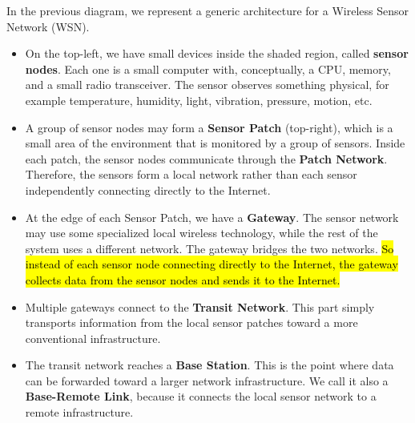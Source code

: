 \begin{examplebox}
\begin{center}
    \end{center}

    In the previous diagram, we represent a generic architecture for a Wireless Sensor Network (WSN).
    \begin{itemize}
        \item On the top-left, we have small devices inside the shaded region, called \textbf{sensor nodes}. Each one is a small computer with, conceptually, a CPU, memory, and a small radio transceiver. The sensor observes something physical, for example temperature, humidity, light, vibration, pressure, motion, etc.

        \item A group of sensor nodes may form a \textbf{Sensor Patch} (top-right), which is a small area of the environment that is monitored by a group of sensors. Inside each patch, the sensor nodes communicate through the \textbf{Patch Network}. Therefore, the sensors form a local network rather than each sensor independently connecting directly to the Internet.

        \item At the edge of each Sensor Patch, we have a \textbf{Gateway}. The sensor network may use some specialized local wireless technology, while the rest of the system uses a different network. The gateway bridges the two networks. \hl{So instead of each sensor node connecting directly to the Internet, the gateway collects data from the sensor nodes and sends it to the Internet.}

        \item Multiple gateways connect to the \textbf{Transit Network}. This part simply transports information from the local sensor patches toward a more conventional infrastructure.

        \item The transit network reaches a \textbf{Base Station}. This is the point where data can be forwarded toward a larger network infrastructure. We call it also a \textbf{Base-Remote Link}, because it connects the local sensor network to a remote infrastructure.


\end{itemize}
\end{examplebox}
